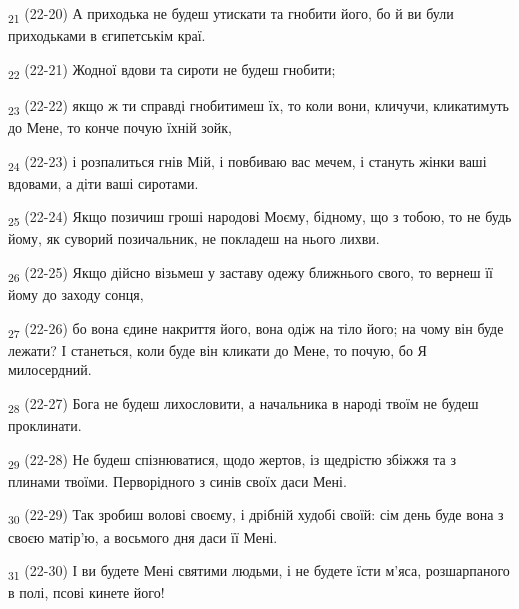 \begin{tcolorbox}
\textsubscript{21} (22-20) А приходька не будеш утискати та гнобити його, бо й ви були приходьками в єгипетськім краї.
\end{tcolorbox}
\begin{tcolorbox}
\textsubscript{22} (22-21) Жодної вдови та сироти не будеш гнобити;
\end{tcolorbox}
\begin{tcolorbox}
\textsubscript{23} (22-22) якщо ж ти справді гнобитимеш їх, то коли вони, кличучи, кликатимуть до Мене, то конче почую їхній зойк,
\end{tcolorbox}
\begin{tcolorbox}
\textsubscript{24} (22-23) і розпалиться гнів Мій, і повбиваю вас мечем, і стануть жінки ваші вдовами, а діти ваші сиротами.
\end{tcolorbox}
\begin{tcolorbox}
\textsubscript{25} (22-24) Якщо позичиш гроші народові Моєму, бідному, що з тобою, то не будь йому, як суворий позичальник, не покладеш на нього лихви.
\end{tcolorbox}
\begin{tcolorbox}
\textsubscript{26} (22-25) Якщо дійсно візьмеш у заставу одежу ближнього свого, то вернеш її йому до заходу сонця,
\end{tcolorbox}
\begin{tcolorbox}
\textsubscript{27} (22-26) бо вона єдине накриття його, вона одіж на тіло його; на чому він буде лежати? І станеться, коли буде він кликати до Мене, то почую, бо Я милосердний.
\end{tcolorbox}
\begin{tcolorbox}
\textsubscript{28} (22-27) Бога не будеш лихословити, а начальника в народі твоїм не будеш проклинати.
\end{tcolorbox}
\begin{tcolorbox}
\textsubscript{29} (22-28) Не будеш спізнюватися, щодо жертов, із щедрістю збіжжя та з плинами твоїми. Перворідного з синів своїх даси Мені.
\end{tcolorbox}
\begin{tcolorbox}
\textsubscript{30} (22-29) Так зробиш волові своєму, і дрібній худобі своїй: сім день буде вона з своєю матір'ю, а восьмого дня даси її Мені.
\end{tcolorbox}
\begin{tcolorbox}
\textsubscript{31} (22-30) І ви будете Мені святими людьми, і не будете їсти м'яса, розшарпаного в полі, псові кинете його!
\end{tcolorbox}
